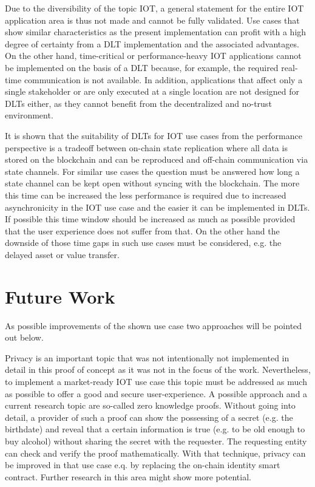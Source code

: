 \documentclass[conference]{IEEEtran}
\begin{document}
Due to the diversibility of the topic IOT, a general statement for the entire IOT application area is thus not made and cannot be fully validated. Use cases that show similar characteristics as the present implementation can profit with a high degree of certainty from a DLT implementation and the associated advantages. On the other hand, time-critical or performance-heavy IOT applications cannot be implemented on the basis of a DLT because, for example, the required real-time communication is not available. In addition, applications that affect only a single stakeholder or are only executed at a single location are not designed for DLTs either, as they cannot benefit from the decentralized and no-trust environment.

It is shown that the suitability of DLTs for IOT use cases from the performance perspective is a tradeoff between on-chain state replication where all data is stored on the blockchain and can be reproduced and off-chain communication via state channels. For similar use cases the question must be answered how long a state channel can be kept open without syncing with the blockchain. The more this time can be increased the less performance is required due to increased asynchronicity in the IOT use case and the easier it can be implemented in DLTs. If possible this time window should be increased as much as possible provided that the user experience does not suffer from that. On the other hand the downside of those time gaps in such use cases must be considered, e.g. the delayed asset or value transfer. 

%
\section{Future Work}

As possible improvements of the shown use case two approaches will be pointed out below.

Privacy is an important topic that was not intentionally not implemented in detail in this proof of concept as it was not in the focus of the work. Nevertheless, to implement a market-ready IOT use case this topic must be addressed as much as possible to offer a good and secure user-experience. A possible approach and a current research topic are so-called zero knowledge proofs. Without going into detail, a provider of such a proof can show the possessing of a secret (e.g. the birthdate) and reveal that a certain information is true (e.g. to be old enough to buy alcohol) without sharing the secret with the requester. The requesting entity can check and verify the proof mathematically. With that technique, privacy can be improved in that use case e.q. by replacing the on-chain identity smart contract. Further research in this area might show more potential.
\end{document}

